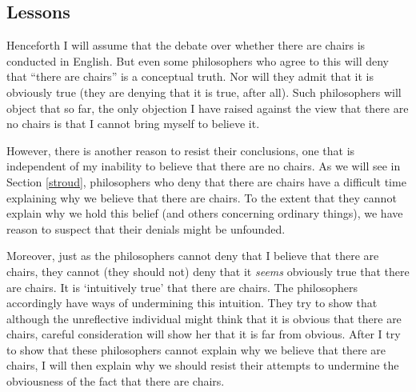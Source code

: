 \documentclass[11pt]{article}
\begin{document}
\begin{spacing}{1.25}

\section{Lessons}
Henceforth I will assume that the debate over whether there are chairs
is conducted in English.  But even some philosophers who agree to this
will deny that ``there are chairs'' is a conceptual truth.  Nor will
they admit that it is obviously true (they are denying that it is
true, after all).  Such philosophers will object that so far, the only
objection I have raised against the view that there are no chairs is
that I cannot bring myself to believe it.

However, there is another reason to resist their conclusions, one that
is independent of my inability to believe that there are no chairs.
As we will see in Section \ref{stroud}, philosophers who deny that
there are chairs have a difficult time explaining why we believe that
there are chairs.  To the extent that they cannot explain why we hold
this belief (and others concerning ordinary things), we have reason to
suspect that their denials might be unfounded.

Moreover, just as the philosophers cannot deny that I believe that
there are chairs, they cannot (they should not) deny that it {\em
  seems} obviously true that there are chairs.  It is `intuitively
true' that there are chairs.  The philosophers accordingly have ways
of undermining this intuition.  They try to show that although the
unreflective individual might think that it is obvious that there are
chairs, careful consideration will show her that it is far from
obvious.  After I try to show that these philosophers cannot explain
why we believe that there are chairs, I will then explain why we
should resist their attempts to undermine the obviousness of the fact
that there are chairs.

\ifstandalone
\end{spacing}


\fi
\end{document}
